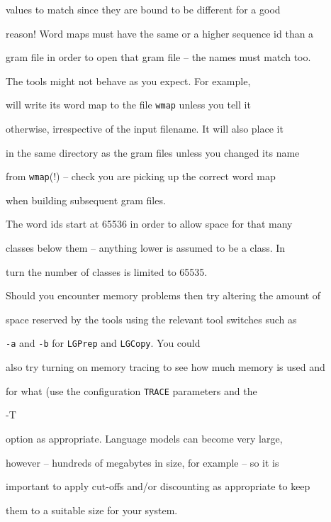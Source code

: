 values to match since they are bound to be different for a good


reason!  Word maps must have the same or a higher sequence id than a


gram file in order to open that gram file -- the names must match too.





The tools might not behave as you expect.  For example, 


will write its word map to the file {\tt wmap} unless you tell it


otherwise, irrespective of the input filename.  It will also place it


in the same directory as the gram files unless you changed its name


from {\tt wmap}(!) -- check you are picking up the correct word map


when building subsequent gram files.





The word ids start at 65536 in order to allow space for that many


classes below them -- anything lower is assumed to be a class.  In


turn the number of classes is limited to 65535.







Should you encounter memory problems then try altering the amount of


space reserved by the tools using the relevant tool switches such as


{\tt -a} and {\tt -b} for {\tt LGPrep} and {\tt LGCopy}.  You could


also try turning on memory tracing to see how much memory is used and


for what (use the configuration {\tt TRACE} parameters and the {\tt


-T} option as appropriate.  Language models can become very large,


however -- hundreds of megabytes in size, for example -- so it is


important to apply cut-offs and/or discounting as appropriate to keep


them to a suitable size for your system.





